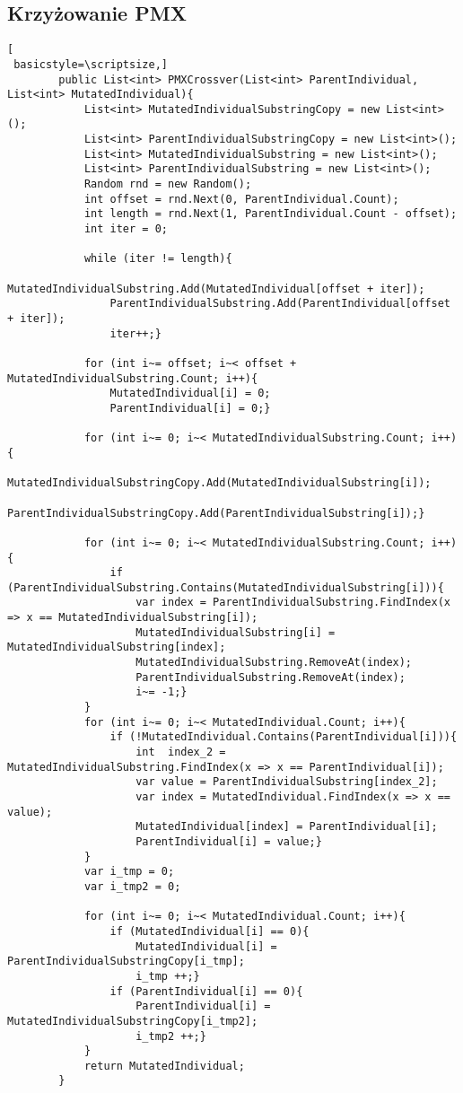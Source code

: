 \subsection*{Krzyżowanie PMX}
\begin{lstlisting}[
 basicstyle=\scriptsize,]
        public List<int> PMXCrossver(List<int> ParentIndividual, List<int> MutatedIndividual){
            List<int> MutatedIndividualSubstringCopy = new List<int>();
            List<int> ParentIndividualSubstringCopy = new List<int>();
            List<int> MutatedIndividualSubstring = new List<int>();
            List<int> ParentIndividualSubstring = new List<int>();
            Random rnd = new Random();
            int offset = rnd.Next(0, ParentIndividual.Count);
            int length = rnd.Next(1, ParentIndividual.Count - offset);
            int iter = 0;

            while (iter != length){
                MutatedIndividualSubstring.Add(MutatedIndividual[offset + iter]);
                ParentIndividualSubstring.Add(ParentIndividual[offset + iter]);
                iter++;}

            for (int i~= offset; i~< offset + MutatedIndividualSubstring.Count; i++){
                MutatedIndividual[i] = 0;
                ParentIndividual[i] = 0;}

            for (int i~= 0; i~< MutatedIndividualSubstring.Count; i++){
                MutatedIndividualSubstringCopy.Add(MutatedIndividualSubstring[i]);
                ParentIndividualSubstringCopy.Add(ParentIndividualSubstring[i]);}

            for (int i~= 0; i~< MutatedIndividualSubstring.Count; i++){
                if (ParentIndividualSubstring.Contains(MutatedIndividualSubstring[i])){
                    var index = ParentIndividualSubstring.FindIndex(x => x == MutatedIndividualSubstring[i]);
                    MutatedIndividualSubstring[i] = MutatedIndividualSubstring[index];
                    MutatedIndividualSubstring.RemoveAt(index);
                    ParentIndividualSubstring.RemoveAt(index);
                    i~= -1;}
            }
            for (int i~= 0; i~< MutatedIndividual.Count; i++){
                if (!MutatedIndividual.Contains(ParentIndividual[i])){
                    int  index_2 = MutatedIndividualSubstring.FindIndex(x => x == ParentIndividual[i]);
                    var value = ParentIndividualSubstring[index_2];
                    var index = MutatedIndividual.FindIndex(x => x == value);
                    MutatedIndividual[index] = ParentIndividual[i];
                    ParentIndividual[i] = value;}
            }
            var i_tmp = 0;
            var i_tmp2 = 0;

            for (int i~= 0; i~< MutatedIndividual.Count; i++){
                if (MutatedIndividual[i] == 0){
                    MutatedIndividual[i] = ParentIndividualSubstringCopy[i_tmp];
                    i_tmp ++;}
                if (ParentIndividual[i] == 0){
                    ParentIndividual[i] = MutatedIndividualSubstringCopy[i_tmp2];
                    i_tmp2 ++;}
            }
            return MutatedIndividual;
        }
\end{lstlisting}

